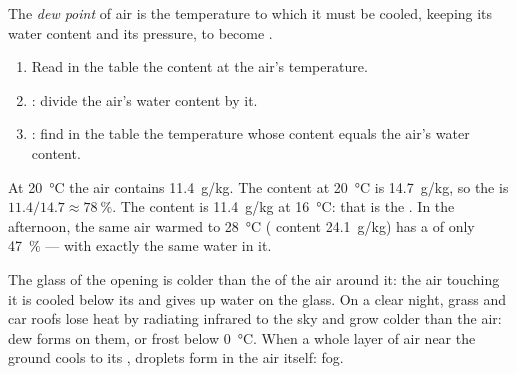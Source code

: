 \begin{definition}\label{def:g10:why-clouds-form:dew-point}
The \emph{dew point} of air is the temperature to which it
must be cooled, keeping its water content and its pressure, to become
.
\end{definition}

\begin{method}\label{met:g10:why-clouds-form:table}
\begin{enumerate}
  \item Read in the table the  content at the air's temperature.
  \item {}: divide the air's water content by it.
  \item {}: find in the table the temperature whose 
        content equals the air's water content.
\end{enumerate}
\end{method}

\begin{example}\label{ex:g10:why-clouds-form:morning}
At \qty{20}{\degreeCelsius} the air contains \qty{11.4}{g/kg}. The
 content at \qty{20}{\degreeCelsius} is \qty{14.7}{g/kg}, so the
 is $11.4/14.7 \approx \qty{78}{\percent}$. The 
content is \qty{11.4}{g/kg} at \qty{16}{\degreeCelsius}: that is the . In the afternoon, the same air warmed to \qty{28}{\degreeCelsius}
( content \qty{24.1}{g/kg}) has a  of only
\qty{47}{\percent} --- with exactly the same water in it.
\end{example}

The glass of the opening is colder than the  of the air around
it: the air touching it is cooled below its  and gives up water on
the glass. On a clear night, grass and car roofs lose heat by radiating
infrared to the sky and grow colder than the air: dew forms on them, or
frost below \qty{0}{\degreeCelsius}. When a whole layer of air near the
ground cools to its , droplets form in the air itself: fog.

